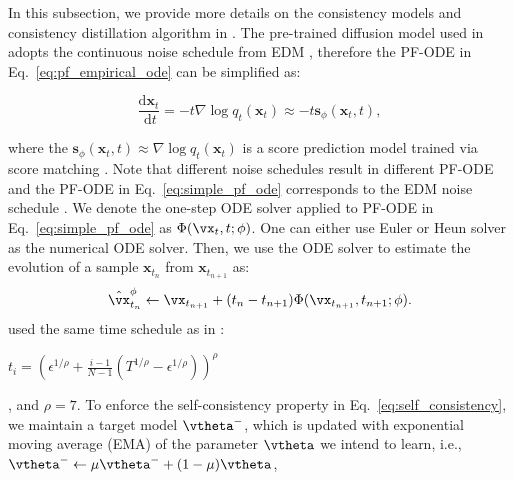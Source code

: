 \documentclass{article} %
\newcommand{\jian}[1]{\textcolor{red}{#1}}
\begin{document}
In this subsection, we provide more details on the consistency models and consistency distillation algorithm in \citep{song2023consistency}.
The pre-trained diffusion model used in \citep{song2023consistency}
adopts the continuous noise schedule from EDM \citep{karras2022elucidating}, therefore the PF-ODE in Eq.~\ref{eq:pf_empirical_ode} can be simplified as:
\begin{small}
\begin{equation}
    \frac{\mathrm{d} \mathbf{x}_t}{\mathrm{~d} t}
    =-t \nabla \log q_t(\boldsymbol{x}_t)
    \approx -t \boldsymbol{s}_\phi\left(\mathbf{x}_t, t\right), \label{eq:simple_pf_ode}
\end{equation}
\end{small}
where the $\boldsymbol{s}_\phi\left(\mathbf{x}_t, t\right)\approx 
\nabla \log q_t(\boldsymbol{x}_t)$ is a score prediction model trained via score matching \citep{hyvarinen2005estimation,song2019generative}. 
Note that different noise schedules result in different PF-ODE and
the PF-ODE in Eq.~\ref{eq:simple_pf_ode} corresponds to the EDM noise schedule \citep{karras2022elucidating}. 
We denote the one-step ODE solver applied to PF-ODE in Eq.~\ref{eq:simple_pf_ode} as $\Phi(\vx_t,t;\phi)$. 
One can either use Euler \citep{song2020score} or Heun solver \citep{karras2022elucidating} as the numerical ODE solver.
Then, we use the ODE solver to estimate the evolution of a sample $\boldsymbol{x}_{t_n}$ from $\boldsymbol{x}_{t_{n+1}}$ as:
\begin{equation}
    \hat{\vx}_{t_n}^\phi\leftarrow \vx_{t_{n+1}}+(t_n-t_{n+1})\Phi(\vx_{t_{n+1}},t_{n+1};\phi).
\end{equation}
\citep{song2020score} used the same time schedule as in \citep{karras2022elucidating}: 
\begin{footnotesize}$t_i=(\epsilon^{1 / \rho}+ \frac{i-1}{N-1}(T^{1 / \rho}-\epsilon^{1 / \rho}))^\rho$\end{footnotesize}, and $\rho=7$.
To enforce the self-consistency property in Eq.~\ref{eq:self_consistency},
we maintain a target model $\vtheta^-$, which is updated with exponential moving average (EMA) of the parameter $\vtheta$ we intend to learn, i.e., $\vtheta^-\leftarrow\mu\vtheta^-+(1-\mu)\vtheta$,
\end{document}

